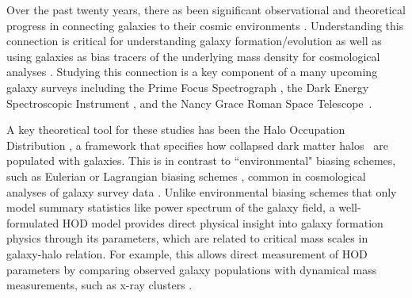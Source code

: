 \documentclass[a4paper,usenatbib]{mnras}
\newcommand{\CH}[1]{{\color{green}CH: #1}}
\begin{document}


Over the past twenty years, there as been significant observational and theoretical progress in connecting galaxies to their cosmic environments \citep{2000MNRAS.318.1144P,2003MNRAS.340..771V,kravtsov2004,2006ApJ...652...71W,2011MNRAS.414.1405N}. Understanding this connection is critical for understanding galaxy formation/evolution \citep{2009MNRAS.399.1773C,2011ApJ...736...59Z} as well as using galaxies as bias tracers of the underlying mass density for cosmological analyses \citep{2000MNRAS.311..793B,2018PhR...733....1D}. Studying this connection is a key component of a many upcoming galaxy surveys including the Prime Focus Spectrograph \citep{2016SPIE.9908E..1MT}, the Dark Energy Spectroscopic Instrument \citep{2016arXiv161100036D}, and the Nancy Grace Roman Space Telescope~\citep{2015arXiv150303757S}.

A key theoretical tool for these studies has been the Halo Occupation 
Distribution \citep[HOD;][]{lemson1999, benson2000, seljak2000, scoccimarro2001, 2002ApJ...575..587B, wechsler2018}, 
a framework that specifies how collapsed dark matter halos~\citep{press1974, bond1991, cooray2002} are populated with galaxies.
This is in contrast to ``environmental" biasing schemes, such as Eulerian 
or Lagrangian biasing schemes \citep{1998MNRAS.293..209M, 2018PhR...733....1D}, 
common in 
cosmological analyses of galaxy survey data \citep{2016MNRAS.457.1770C,2020JCAP...05..042I,2021PhRvL.126n1301T}.
Unlike environmental biasing schemes that %
only model summary statistics
like power spectrum of the galaxy field,
a well-formulated HOD model provides direct physical insight into galaxy formation physics 
through its parameters, which are %
related to critical mass scales in galaxy-halo relation. 
For example, this allows direct measurement of HOD parameters by comparing observed galaxy populations with dynamical mass measurements, such as x-ray clusters \citep{2009ApJ...707..554Z,2016MNRAS.463.1929M}. 
\end{document}
